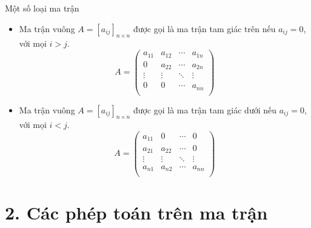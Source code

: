 \documentclass[pdf,10pt]{beamer}
\begin{document}
\begin{frame}{Một số loại ma trận}
	\begin{itemize}
		\item Ma trận vuông $A= [a_{ij}]_{n\times n}$ được gọi là ma trận tam giác trên nếu $a_{ij}=0$,  với mọi $i>j$.
		\begin{displaymath}
			A =
			\left (
			\begin{array}{cccc}
				a_{11} & a_{12} & \cdots & a_{1n} \\
				0  & a_{22} & \cdots & a_{2n} \\
				\vdots & \vdots & \ddots & \vdots \\
				0 & 0 & \cdots & a_{nn}\\
			\end{array}
			\right )
		\end{displaymath}
		\item Ma trận vuông $A= [a_{ij}]_{n\times n}$ được gọi là ma trận tam giác dưới nếu $a_{ij}=0$, với mọi $i<j$.
		\begin{displaymath}
			A =
			\left (
			\begin{array}{cccc}
				a_{11} & 0 & \cdots & 0 \\
				a_{21} & a_{22} & \cdots & 0 \\
				\vdots & \vdots & \ddots & \vdots \\
				a_{n1} & a_{n2} & \cdots & a_{nn} \\
			\end{array}
			\right )
		\end{displaymath}
	\end{itemize}
\end{frame}

\section{2. Các phép toán trên ma trận}
\end{document}
